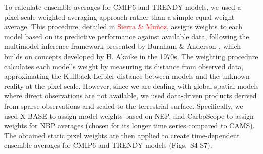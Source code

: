 \documentclass[9pt,twocolumn,twoside]{pnas-new}
\begin{document}
{To calculate ensemble averages for CMIP6 and TRENDY models, we used a pixel-scale weighted averaging approach rather than a simple equal-weight average. This procedure, detailed in \textcolor{red}{Sierra \& Muñoz}, assigns weights to each model based on its predictive performance against available data, following the multimodel inference framework presented by Burnham \& Anderson \cite{Burnham2002}, which builds on concepts developed by H. Akaike in the 1970s. The weighting procedure calculates each model's weight by measuring its distance from observed data, approximating the Kullback-Leibler distance between models and the unknown reality at the pixel scale. However, since we are dealing with global spatial models where direct observations are not available, we used data-driven products derived from sparse observations and scaled to the terrestrial surface. Specifically, we used X-BASE to assign model weights based on NEP, and CarboScope to assign weights for NBP averages (chosen for its longer time series compared to CAMS). The obtained static pixel weights are then applied to create time-dependent ensemble averages for CMIP6 and TRENDY models (Figs.~S4-S7).







 



}
\end{document}
